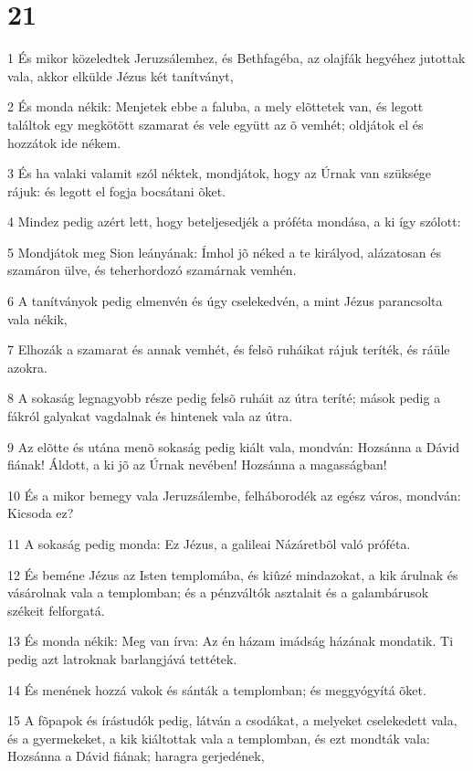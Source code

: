\chapter{21}

\par 1 És mikor közeledtek Jeruzsálemhez, és Bethfagéba, az olajfák hegyéhez jutottak vala, akkor elkülde Jézus két tanítványt,
\par 2 És monda nékik: Menjetek ebbe a faluba, a mely elõttetek van, és legott találtok egy megkötött szamarat és vele együtt az õ vemhét; oldjátok el és hozzátok ide nékem.
\par 3 És ha valaki valamit szól néktek, mondjátok, hogy az Úrnak van szüksége rájuk: és legott el fogja bocsátani õket.
\par 4 Mindez pedig azért lett, hogy beteljesedjék a próféta mondása, a ki így szólott:
\par 5 Mondjátok meg Sion leányának: Ímhol jõ néked a te királyod, alázatosan és szamáron ülve, és teherhordozó szamárnak vemhén.
\par 6 A tanítványok pedig elmenvén és úgy cselekedvén, a mint Jézus parancsolta vala nékik,
\par 7 Elhozák a szamarat és annak vemhét, és felsõ ruháikat rájuk teríték, és ráüle azokra.
\par 8 A sokaság legnagyobb része pedig felsõ ruháit az útra teríté; mások pedig a fákról galyakat vagdalnak és hintenek vala az útra.
\par 9 Az elõtte és utána menõ sokaság pedig kiált vala, mondván: Hozsánna a Dávid fiának! Áldott, a ki jõ az Úrnak nevében! Hozsánna a magasságban!
\par 10 És a mikor bemegy vala Jeruzsálembe, felháborodék az egész város, mondván: Kicsoda ez?
\par 11 A sokaság pedig monda: Ez Jézus, a galileai Názáretbõl való próféta.
\par 12 És beméne Jézus az Isten templomába, és kiûzé mindazokat, a kik árulnak és vásárolnak vala a templomban; és a pénzváltók asztalait és a galambárusok székeit felforgatá.
\par 13 És monda nékik: Meg van írva: Az én házam imádság házának mondatik. Ti pedig azt latroknak barlangjává  tettétek.
\par 14 És menének hozzá vakok és sánták a templomban; és meggyógyítá õket.
\par 15 A fõpapok és írástudók pedig, látván a csodákat, a melyeket cselekedett vala, és a gyermekeket, a kik kiáltottak vala a templomban, és ezt mondták vala: Hozsánna a Dávid fiának; haragra gerjedének,
